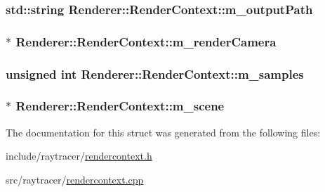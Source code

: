 \subsubsection[{m\+\_\+output\+Path}]{\setlength{\rightskip}{0pt plus 5cm}std\+::string Renderer\+::\+Render\+Context\+::m\+\_\+output\+Path}\label{structRenderer_1_1RenderContext_ae317255b06e72c9d98dd65853232a303}
\hypertarget{structRenderer_1_1RenderContext_a51c51a98344d7acdef2da9c1f46fd0f8}{}
\subsubsection[{m\+\_\+render\+Camera}]{$\ast$ Renderer\+::\+Render\+Context\+::m\+\_\+render\+Camera}\label{structRenderer_1_1RenderContext_a51c51a98344d7acdef2da9c1f46fd0f8}
\hypertarget{structRenderer_1_1RenderContext_abb2007b9ebefdaa2fe0855b19bcc75d5}{}
\subsubsection[{m\+\_\+samples}]{\setlength{\rightskip}{0pt plus 5cm}unsigned int Renderer\+::\+Render\+Context\+::m\+\_\+samples}\label{structRenderer_1_1RenderContext_abb2007b9ebefdaa2fe0855b19bcc75d5}
\hypertarget{structRenderer_1_1RenderContext_adcb12a26eedfa83b6c72d39bbef539b0}{}
\subsubsection[{m\+\_\+scene}]{$\ast$ Renderer\+::\+Render\+Context\+::m\+\_\+scene}\label{structRenderer_1_1RenderContext_adcb12a26eedfa83b6c72d39bbef539b0}


The documentation for this struct was generated from the following files\+:\begin{DoxyCompactItemize}
\item 
include/raytracer/\hyperlink{rendercontext_8h}{rendercontext.\+h}\item 
src/raytracer/\hyperlink{rendercontext_8cpp}{rendercontext.\+cpp}\end{DoxyCompactItemize}
